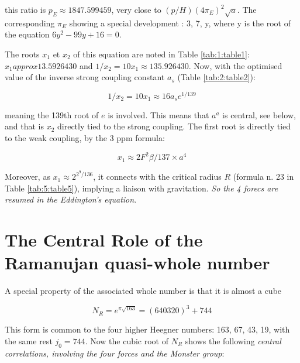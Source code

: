 \documentclass[a4paper,9pt]{article}
\begin{document}
this ratio is $p_E \approx 1847.599459$, very close to $(p/H)(4\pi_E)^2\sqrt a$. The corresponding $\pi_E$ showing a special development : 3, 7, y, where y is the root of the equation $6y^2 - 99 y + 16 = 0$. 

The roots $x_1$ et $x_2$ of this equation are noted in Table \ref{tab:1:table1}: $x_1 approx 13.5926430$ and $1/x_2 = 10 x_1 \approx  135.926430$. Now, with the optimised value of the inverse strong coupling constant $a_s$ (Table \ref{tab:2:table2}):

\begin{equation}
 1/x_2 = 10 x_1 \approx 16 a_s e^{1/139}     
\end{equation}

meaning the 139th root of $e$ is involved. This means that $a^a$ is central, see below, and that is $x_2$ directly tied to the strong coupling. The first root is directly tied to the weak coupling, by the 3 ppm formula:

\begin{equation}
  x_1 \approx 2F^2 \beta /137\times a^4    
\end{equation}

Moreover, as $x_1 \approx 2^{2^9/136}$, it connects with the critical radius $R$ (formula n. 23 in Table \ref{tab:5:table5}), implying a liaison with gravitation. \textit{So the 4 forecs are resumed in the Eddington's equation}.







\section{The Central Role of the Ramanujan quasi-whole number}



A special property of the associated whole number is that it is almost a cube

\begin{equation}
N_R = e^{\pi \sqrt{163}} = (640320)^3 + 744
\end{equation}

This form is common to the four higher Heegner numbers: 163, 67, 43, 19, with the same rest $j_0 = 744$. Now the cubic root of $N_R$ shows the following \textit {central correlations, involving the four forces and the Monster group}:
\end{document}
